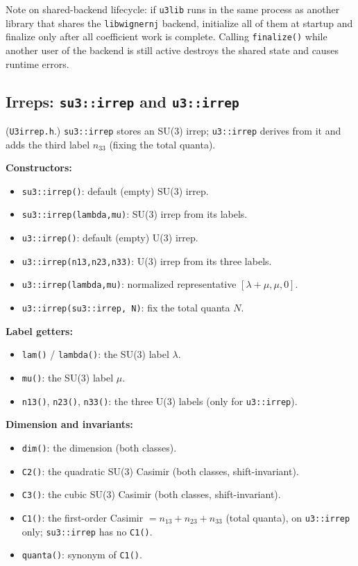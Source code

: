 \documentclass[aps,onecolumn,10pt,superscriptaddress,floatfix,nofootinbib]{revtex4}
\begin{document}
Note on shared-backend lifecycle: if \texttt{u3lib} runs in the same process as another library that shares the \texttt{libwignernj} backend, initialize all of them at startup and finalize only after all coefficient work is complete. Calling \verb|finalize()| while another user of the backend is still active destroys the shared state and causes runtime errors.

\subsection{Irreps: \texttt{su3::irrep} and \texttt{u3::irrep}}
(\verb|U3irrep.h|.) \verb|su3::irrep| stores an SU(3) irrep; \verb|u3::irrep|
derives from it and adds the third label $n_{33}$ (fixing the total quanta).

\textbf{Constructors:}
\begin{itemize}
    \item \verb|su3::irrep()|: default (empty) SU(3) irrep.
    \item \verb|su3::irrep(lambda,mu)|: SU(3) irrep from its labels.
    \item \verb|u3::irrep()|: default (empty) U(3) irrep.
    \item \verb|u3::irrep(n13,n23,n33)|: U(3) irrep from its three labels.
    \item \verb|u3::irrep(lambda,mu)|: normalized representative $[\lambda{+}\mu,\mu,0]$.
    \item \verb|u3::irrep(su3::irrep, N)|: fix the total quanta $N$.
\end{itemize}

\textbf{Label getters:}
\begin{itemize}
    \item \verb|lam()| / \verb|lambda()|: the SU(3) label $\lambda$.
    \item \verb|mu()|: the SU(3) label $\mu$.
    \item \verb|n13()|, \verb|n23()|, \verb|n33()|: the three U(3) labels (only for \verb|u3::irrep|).
\end{itemize}

\textbf{Dimension and invariants:}
\begin{itemize}
    \item \verb|dim()|: the dimension (both classes).
    \item \verb|C2()|: the quadratic SU(3) Casimir (both classes, shift-invariant).
    \item \verb|C3()|: the cubic SU(3) Casimir (both classes, shift-invariant).
    \item \verb|C1()|: the first-order Casimir $=n_{13}{+}n_{23}{+}n_{33}$ (total quanta), on \verb|u3::irrep| only; \verb|su3::irrep| has no \verb|C1()|.
    \item \verb|quanta()|: synonym of \verb|C1()|.
\end{itemize}
\end{document}
